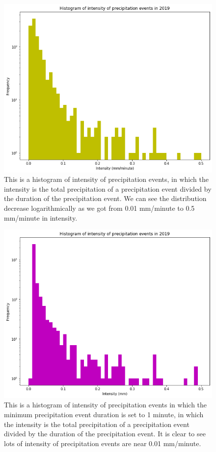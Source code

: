 \documentclass[12pt]{article}
\begin{document}
	\begin{figure}[h]
		\centering
		\includegraphics[width=150mm]{intensity_hist_5min.png}
		\caption{This is a histogram of intensity of precipitation events, in which the intensity is the total precipitation of a precipitation event divided by the duration of the precipitation event. We can see the distribution decrease logarithmically as we got from 0.01 mm/minute to 0.5 mm/minute in intensity.}
	\end{figure}
	\begin{figure}[h]
	\centering
	\includegraphics[width=150mm]{intensity_hist_1min.png}
	\caption{This is a histogram of intensity of precipitation events in which the minimum precipitation event duration is set to 1 minute, in which the intensity is the total precipitation of a precipitation event divided by the duration of the precipitation event. It is clear to see lots of intensity of precipitation events are near 0.01 mm/minute.}
\end{figure}
\end{document}
